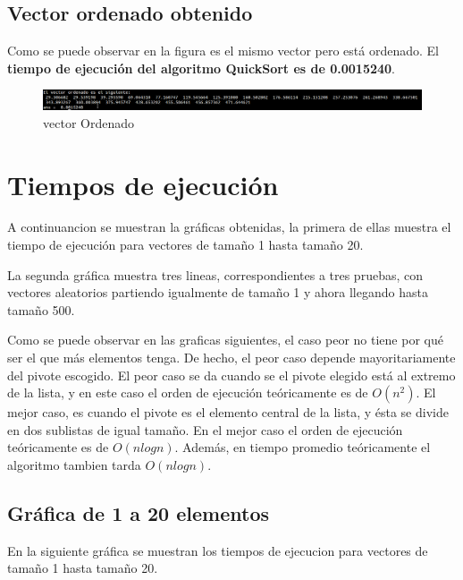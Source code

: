 \documentclass[a4,12pt]{article}
\begin{document}
\subsection{Vector ordenado obtenido}
Como se puede observar en la figura es el mismo vector pero está ordenado. 
El \textbf{tiempo de ejecución del algoritmo QuickSort es de 0.0015240}.
\begin{figure}[h]
\includegraphics[width=1\textwidth]{Graficos/vectorOrdenado}
\caption{vector Ordenado}
\label{fig:vectorOrdenado}
\end{figure}

\section{Tiempos de ejecución}
A continuancion se muestran la gráficas obtenidas, la primera de ellas muestra el tiempo de ejecución para vectores de tamaño 1 hasta tamaño 20.
 
 \medskip
La segunda gráfica muestra tres lineas, correspondientes a tres pruebas, con vectores aleatorios partiendo igualmente de tamaño 1 y ahora llegando hasta tamaño 500.
 
 \medskip
Como se puede observar en las graficas siguientes, el caso peor no tiene por qué ser el que más elementos tenga. De hecho, el peor caso depende mayoritariamente del pivote  escogido. El peor caso se da cuando se el pivote elegido está al extremo de la lista, y en este caso el orden de ejecución teóricamente es de $O(n^2)$.
El mejor caso, es cuando el pivote es el elemento central de la lista, y ésta se divide en dos sublistas de igual tamaño. En el mejor caso el orden de ejecución teóricamente es de $O(nlogn)$. Además, en tiempo promedio teóricamente el algoritmo tambien tarda $O(nlogn)$.

\subsection{Gráfica de 1 a 20 elementos}
En la siguiente gráfica se muestran los tiempos de ejecucion para vectores de tamaño 1 hasta tamaño 20.
\end{document}
